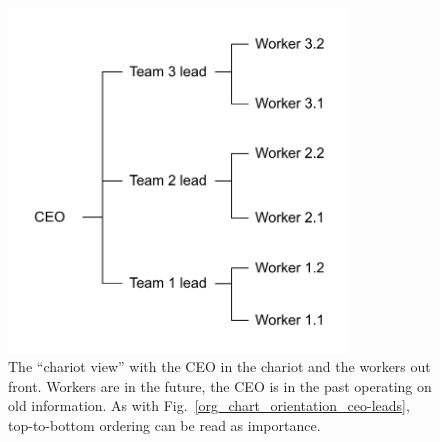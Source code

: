 \begin{figure}
\includegraphics[width=0.8\textwidth]{images/org-chart-orientation-workers-lead.pdf}
\caption{The ``chariot view'' with the CEO in the chariot and the workers out front. Workers are in the future, the CEO is in the past operating on old information. As with Fig.~\ref{org_chart_orientation_ceo-leads}, top-to-bottom ordering can be read as importance. }
\label{org_chart_orientation_ceo-follows}
\end{figure}



